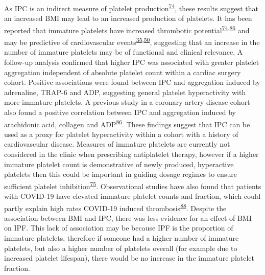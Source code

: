\documentclass[11pt,twoside]{bristolthesis}
\begin{document}
As IPC is an indirect measure of platelet production\textsuperscript{\protect\hyperlink{ref-Lev2016a}{74}}, these results suggest that an increased BMI may lead to an increased production of platelets. It has been reported that immature platelets have increased thrombotic potential\textsuperscript{\protect\hyperlink{ref-Lev2016a}{74},\protect\hyperlink{ref-Grove2011a}{86}} and may be predictive of cardiovascular events\textsuperscript{\protect\hyperlink{ref-Freynhofer2017a}{35},\protect\hyperlink{ref-Ibrahim2014}{50}}, suggesting that an increase in the number of immature platelets may be of functional and clinical relevance. A follow-up analysis confirmed that higher IPC was associated with greater platelet aggregation independent of absolute platelet count within a cardiac surgery cohort. Positive associations were found between IPC and aggregation induced by adrenaline, TRAP-6 and ADP, suggesting general platelet hyperactivity with more immature platelets. A previous study in a coronary artery disease cohort also found a positive correlation between IPC and aggregation induced by arachidonic acid, collagen and ADP\textsuperscript{\protect\hyperlink{ref-Grove2011a}{86}}. These findings suggest that IPC can be used as a proxy for platelet hyperactivity within a cohort with a history of cardiovascular disease. Measures of immature platelets are currently not considered in the clinic when prescribing antiplatelet therapy, however if a higher immature platelet count is demonstrative of newly produced, hyperactive platelets then this could be important in guiding dosage regimes to ensure sufficient platelet inhibition\textsuperscript{\protect\hyperlink{ref-Bernlochner2015a}{75}}. Observational studies have also found that patients with COVID-19 have elevated immature platelet counts and fraction, which could partly explain high rates COVID-19 induced thrombosis\textsuperscript{\protect\hyperlink{ref-Klok2020}{88}}. Despite the association between BMI and IPC, there was less evidence for an effect of BMI on IPF. This lack of association may be because IPF is the proportion of immature platelets, therefore if someone had a higher number of immature platelets, but also a higher number of platelets overall (for example due to increased platelet lifespan), there would be no increase in the immature platelet fraction.
\end{document}
